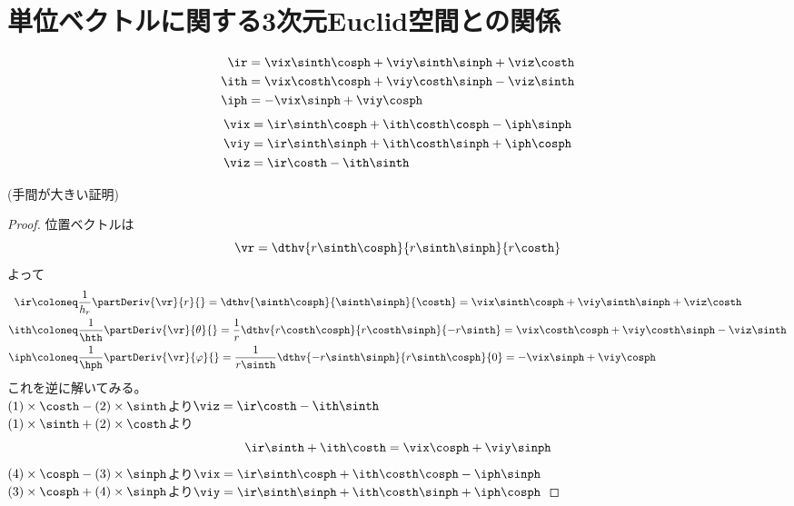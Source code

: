     \section{単位ベクトルに関する3次元Euclid空間との関係}
        \begin{shadebox}
            \begin{align*}
                \ir &= \vix\sinth\cosph + \viy\sinth\sinph + \viz\costh\\
                \ith &= \vix\costh\cosph + \viy\costh\sinph - \viz\sinth\\
                \iph &= -\vix\sinph + \viy\cosph
            \end{align*}
            \begin{align*}
                \vix &= \ir\sinth\cosph + \ith\costh\cosph -\iph\sinph\\
                \viy &= \ir\sinth\sinph + \ith\costh\sinph + \iph\cosph\\
                \viz &= \ir\costh - \ith\sinth
            \end{align*}
        \end{shadebox}
        \noindent(手間が大きい証明)
        \begin{proof}
            位置ベクトルは
            \[\vr = \dthv{r\sinth\cosph}{r\sinth\sinph}{r\costh}\]
            よって
            \begin{align}
                \ir &\coloneq \frac{1}{h_r}\partDeriv{\vr}{r}{} = \dthv{\sinth\cosph}{\sinth\sinph}{\costh} = \vix\sinth\cosph + \viy\sinth\sinph + \viz\costh \\
                \ith &\coloneq \frac{1}{\hth}\partDeriv{\vr}{\theta}{} = \frac{1}{r}\dthv{r\costh\cosph}{r\costh\sinph}{-r\sinth} = \vix\costh\cosph + \viy\costh\sinph - \viz\sinth \\
                \iph &\coloneq \frac{1}{\hph}\partDeriv{\vr}{\varphi}{} = \frac{1}{r\sinth}\dthv{-r\sinth\sinph}{r\sinth\cosph}{0} = -\vix\sinph + \viy\cosph
            \end{align}
            これを逆に解いてみる。\\
            $(1)\times\costh-(2)\times\sinth$より$\viz = \ir\costh - \ith\sinth$\\
            $(1)\times\sinth+(2)\times\costh$より
            \begin{equation}
                \ir\sinth+\ith\costh = \vix\cosph+\viy\sinph
            \end{equation}
            $(4)\times\cosph-(3)\times\sinph$より$\vix = \ir\sinth\cosph + \ith\costh\cosph -\iph\sinph$\\
            $(3)\times\cosph+(4)\times\sinph$より$\viy = \ir\sinth\sinph + \ith\costh\sinph + \iph\cosph$
        \end{proof}
